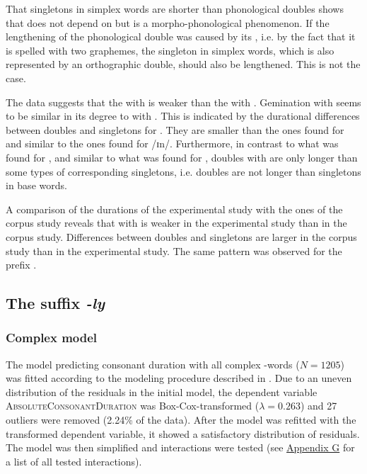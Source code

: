That singletons in simplex words are shorter than phonological doubles shows that  does not depend on  but is a {morpho-phonological phenomenon}. If the lengthening of the phonological double was caused by its , i.e. by the fact that it is spelled with two graphemes, the singleton in simplex words, which is also represented by an orthographic double, should also be lengthened. This is not the case. 


The data suggests that the  with  is weaker than the  with . Gemination with  seems to be similar in its degree to  with . 
This is indicated by the durational differences between doubles and singletons for . They are smaller than the ones found for  and similar to the ones found for /ɪn/. 
Furthermore, in contrast to what was found for , and similar to what was found for , doubles with  are only longer than some types of corresponding singletons, i.e. doubles are not longer than singletons in base words.



A comparison of the durations of the experimental study with the ones of the corpus study reveals that  with  is weaker in the experimental study than in the corpus study. Differences between doubles and singletons are larger in the corpus study than in the experimental study. The same pattern was observed for the prefix .


\subsection{The suffix \textit{-ly} }

\subsubsection{Complex model}

The model predicting consonant duration with all complex -words ($N=1205$) was fitted according to the modeling procedure described in . Due to an uneven distribution of the residuals in the initial model, the dependent variable \textsc{AbsoluteConsonantDuration} was Box-Cox-transformed ($\lambda = 0.263$) and 27 outliers were removed (2.24\% of the data). 
After the model was refitted with the transformed dependent variable, it showed a satisfactory distribution of residuals. The model was then simplified and interactions were tested (see \hyperref[Appendix G Summaries of tested interactions in experimental study]{Appendix G} for a list of all tested interactions). 

